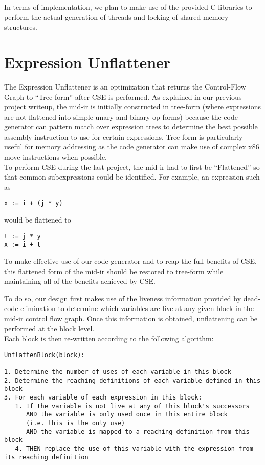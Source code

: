 \documentclass[11pt]{article}
\begin{document}
In terms of implementation, we plan to make use of the provided C
libraries to perform the actual generation of threads and locking of
shared memory structures.  

\section {Expression Unflattener}
\label{sec:unflatten}

The Expression Unflattener is an optimization that returns the
Control-Flow Graph to ``Tree-form'' after CSE is performed. As
explained in our previous project writeup, the mid-ir is initially constructed
in tree-form (where expressions are not flattened into simple unary
and binary op forms) because the code generator can pattern match over
expression trees to determine the best possible assembly
instruction to use for certain expressions. Tree-form is particularly
useful for memory addressing as the code generator can make use of
complex x86 move instructions when possible.\\

To perform CSE during the last project, the mid-ir had to first be
``Flattened'' so that common subexpressions could be identified. For
example, an expression such as 

\begin{verbatim}
x := i + (j * y)
\end{verbatim} 

\noindent would be flattened to 

\begin{verbatim}
t := j * y 
x := i + t
\end{verbatim}

To make effective use of our code generator and to reap the full
benefits of CSE, this flattened form of the mid-ir should be restored
to tree-form while maintaining all of the benefits achieved by CSE. 

To do so, our design first makes use of the liveness information
provided by dead-code elimination to determine which variables are
live at any given block in the mid-ir control flow graph. Once this
information is obtained, unflattening can be performed at the block
level.\\


\noindent Each block is then re-written according to the following algorithm: 

\begin{verbatim}
UnflattenBlock(block):

1. Determine the number of uses of each variable in this block 
2. Determine the reaching definitions of each variable defined in this
block
3. For each variable of each expression in this block: 
   1. If the variable is not live at any of this block's successors 
      AND the variable is only used once in this entire block 
      (i.e. this is the only use)
      AND the variable is mapped to a reaching definition from this block 
   4. THEN replace the use of this variable with the expression from
its reaching definition
\end{verbatim}
\end{document}
